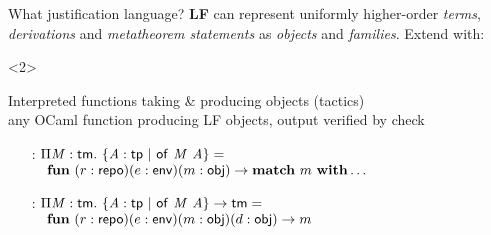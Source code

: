 \documentclass{beamer}
\theoremstyle{example}
\begin{document}
\begin{frame}{What justification language?}
  \textbf{LF} can represent uniformly higher-order \emph{terms}, \emph{derivations} and
  \emph{metatheorem statements} as \emph{objects} and
  \emph{families}. \pause Extend with:
  \begin{overlayarea}\textwidth{18em}
    \begin{onlyenv}<2>
      \begin{block}{Interpreted functions} taking \& producing objects (tactics) \\
        {\footnotesize any OCaml function producing LF objects, output
          verified by \textsf{check}}
        \begin{example}
          \begin{enumerate}[inline]
          \item[\const{infer} :] $\Pi{\ensuremath{\text{\textit{M}}}}:{\text{\textsf{tm}}}.\ 
            \{{\text{\textit{A}}}:{\text{\textsf{tp}}}\ |\ {{\text{\textsf{of}}}\ {\text{\textit{M}}}\ {\text{\textit{A}}}}\} =$ \\
            {\small$\quad\mathbf{fun}\ (r : \text{\textsf{repo}}) (e :
              \text{\textsf{env}}) (m : \text{\textsf{obj}}) \to \mathbf{match}\ m\
              \mathbf{with} \ldots$}
            \\[1em]

          \item[\const{get} :] $\Pi{\ensuremath{\text{\textit{M}}}}:{\text{\textsf{tm}}}.\  \{{\text{\textit{A}}}:{\text{\textsf{tp}}}\ |\ {{\text{\textsf{of}}}\ {\text{\textit{M}}}\ {\text{\textit{A}}}}\}
            \to \text{\textsf{tm}}=$ \\
            {\small$\quad\mathbf{fun}\ (r : \text{\textsf{repo}}) (e :
              \text{\textsf{env}}) (m : \text{\textsf{obj}}) (d : \text{\textsf{obj}})\to m$}
            \\[1em]


\end{enumerate}
\end{example}
\end{block}
\end{onlyenv}
\end{overlayarea}
\end{frame}
\end{document}
